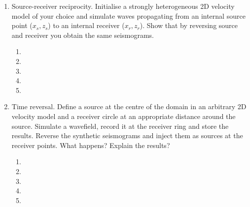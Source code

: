 \begin{enumerate}
\begin{enumerate}
\item[]
\item[]
\item[] 
\item[]
\item[] 
\end{enumerate}
\item
Source-receiver reciprocity. Initialise a strongly heterogeneous 2D velocity model of your choice and simulate waves propagating from an internal source point ($x_s, z_s$) to an internal receiver ($x_r, z_r$). Show that by reversing source and receiver you obtain the same seismograms.
\begin{enumerate}
\item[]
\item[]
\item[] 
\item[]
\item[] 
\end{enumerate}
\item
Time reversal. Define  a source at the centre of the domain in an arbitrary 2D velocity model and a receiver circle at an appropriate distance around the source. Simulate a wavefield, record it at the receiver ring and store the results. Reverse the synthetic seismograms and inject them as sources at the receiver points. What happens? Explain the results?   
\begin{enumerate}
\item[]
\item[]
\item[] 
\item[]
\item[] 
\end{enumerate} 
\end{enumerate}